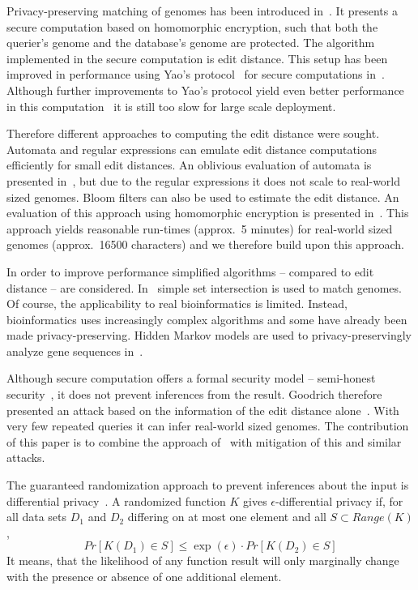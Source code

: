 \documentclass{llncs}
\begin{document}
Privacy-preserving matching of genomes has been introduced in~\cite{AtaKer03}.
It presents a secure computation based on homomorphic encryption, such that both the querier's genome and the database's genome are protected.
The algorithm implemented in the secure computation is edit distance.
This setup has been improved in performance using Yao's protocol~\cite{Yao86} for secure computations in~\cite{JhaKru08}.
Although further improvements to Yao's protocol yield even better performance in this computation~\cite{HuaEva11} it is still too slow for large scale deployment.

Therefore different approaches to computing the edit distance were sought.
Automata and regular expressions can emulate edit distance computations efficiently for small edit distances.
An oblivious evaluation of automata is presented in~\cite{TroKat07}, but due to the regular expressions it does not scale to real-world sized genomes.
Bloom filters can also be used to estimate the edit distance.
An evaluation of this approach using homomorphic encryption is presented in~\cite{BecKer12}.
This approach yields reasonable run-times (approx.~5 minutes) for real-world sized genomes  (approx.~16500 characters) and we therefore build upon this approach.



In order to improve performance simplified algorithms -- compared to edit distance -- are considered.
In~\cite{BalBar11} simple set intersection is used to match genomes.
Of course, the applicability to real bioinformatics is limited.
Instead, bioinformatics uses increasingly complex algorithms and some have already been made privacy-preserving.
Hidden Markov models are used to privacy-preservingly analyze gene sequences in~\cite{FraKat11}.

Although secure computation offers a formal security model -- semi-honest security~\cite{Gol04}, it does not prevent inferences from the result.
Goodrich therefore presented an attack based on the information of the edit distance alone~\cite{Goo09}.
With very few repeated queries it can infer real-world sized genomes.
The contribution of this paper is to combine the approach of~\cite{BecKer12} with mitigation of this and similar attacks.

The guaranteed randomization approach to prevent inferences about the input is differential privacy~\cite{Dwo08}.
A randomized function $K$ gives $\epsilon$-differential privacy if, for all data sets $D_1$ and $D_2$ differing on at most one element and all $S \subset Range(K)$,
$$ Pr[K(D_1) \in S] \le \exp(\epsilon) \cdot Pr[K(D_2) \in S] $$
It means, that the likelihood of any function result will only marginally change with the presence or absence of one additional element. 
\end{document}
